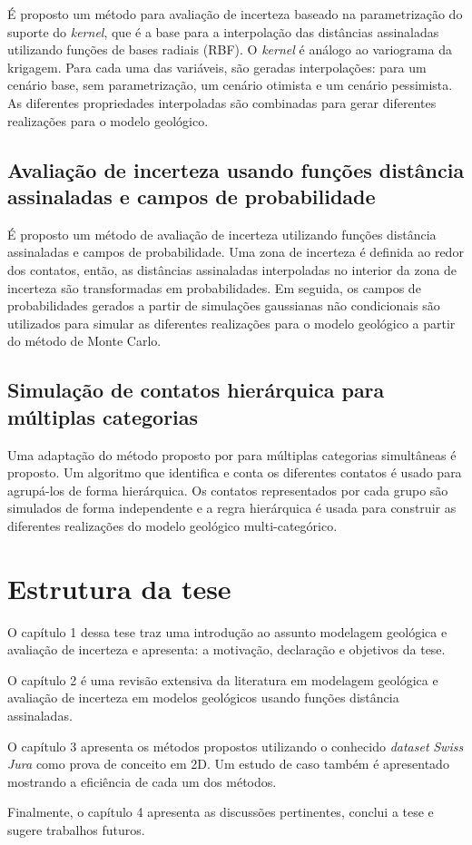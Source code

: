 É proposto um método para avaliação de incerteza baseado na parametrização do suporte do \textit{kernel}, que é a base para a interpolação das distâncias assinaladas utilizando funções de bases radiais (RBF). O \textit{kernel} é análogo ao variograma da krigagem. Para cada uma das variáveis, são geradas interpolações: para um cenário base, sem parametrização, um cenário otimista e um cenário pessimista. As diferentes propriedades interpoladas são combinadas para gerar diferentes realizações para o modelo geológico.  

\subsection{Avaliação de incerteza usando funções distância assinaladas e campos de probabilidade}

É proposto um método de avaliação de incerteza utilizando funções distância assinaladas e campos de probabilidade. Uma zona de incerteza é definida ao redor dos contatos, então, as distâncias assinaladas interpoladas no interior da zona de incerteza são transformadas em probabilidades. Em seguida, os campos de probabilidades gerados a partir de simulações gaussianas não condicionais são utilizados para simular as diferentes realizações para o modelo geológico a partir do método de Monte Carlo.

\subsection{Simulação de contatos hierárquica para múltiplas categorias}

Uma adaptação do método proposto por  para múltiplas categorias simultâneas é proposto. Um algoritmo que identifica e conta os diferentes contatos é usado para agrupá-los de forma hierárquica. Os contatos representados por cada grupo são simulados de forma independente e a regra hierárquica é usada para construir as diferentes realizações do modelo geológico multi-categórico. 

\section{Estrutura da tese}

O capítulo 1 dessa tese traz uma introdução ao assunto modelagem geológica e avaliação de incerteza e apresenta: a motivação, declaração e objetivos da tese.

O capítulo 2 é uma revisão extensiva da literatura em modelagem geológica e avaliação de incerteza em modelos geológicos usando funções distância assinaladas. 

O capítulo 3 apresenta os métodos propostos utilizando o conhecido \textit{dataset} \textit{Swiss Jura} \cite{goovaerts1997geostatistics} como prova de conceito em 2D. Um estudo de caso também é apresentado mostrando a eficiência de cada um dos métodos.

Finalmente, o capítulo 4 apresenta as discussões pertinentes, conclui a tese e sugere trabalhos futuros.